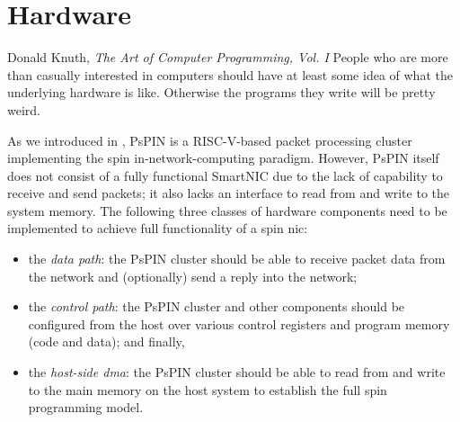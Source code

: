 \chapter{Hardware} \label{chap:hardware}
\begin{chapquote}{Donald Knuth, \textit{The Art of Computer Programming, Vol. I}}
People who are more than casually interested in computers should have at least some idea of what the underlying hardware is like. Otherwise the programs they write will be pretty weird.
\end{chapquote}


As we introduced in , PsPIN is a RISC-V-based packet processing cluster implementing the \ac{spin} in-network-computing paradigm.  However, PsPIN itself does not consist of a fully functional SmartNIC due to the lack of capability to receive and send packets; it also lacks an interface to read from and write to the system memory.  The following three classes of hardware components need to be implemented to achieve full functionality of a \ac{spin} \ac{nic}: 

\begin{itemize}
    \item the \emph{data path}: the PsPIN cluster should be able to receive packet data from the network and (optionally) send a reply into the network;
    \item the \emph{control path}: the PsPIN cluster and other components should be configured from the host over various control registers and program memory (code and data); and finally,
    \item the \emph{host-side \ac{dma}}: the PsPIN cluster should be able to read from and write to the main memory on the host system to establish the full \ac{spin} programming model.
\end{itemize}

